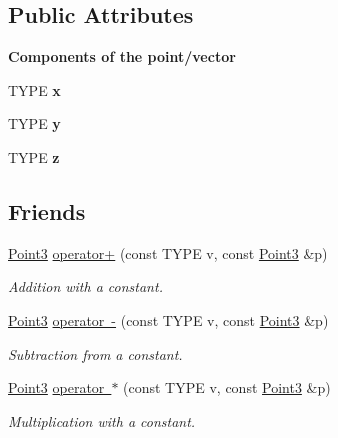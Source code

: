\subsection*{Public Attributes}
\begin{Indent}\textbf{ Components of the point/vector}\par
\begin{DoxyCompactItemize}
\item 
\mbox{\label{classcy_1_1_point3_a7dca00168c1355681da23267091b14a5}} 
T\+Y\+PE {\bfseries x}
\item 
\mbox{\label{classcy_1_1_point3_a93d893a1fa7e380e501eafb9c1cc613a}} 
T\+Y\+PE {\bfseries y}
\item 
\mbox{\label{classcy_1_1_point3_ac1192d48d48b7abe7eb1ad3e051918d9}} 
T\+Y\+PE {\bfseries z}
\end{DoxyCompactItemize}
\end{Indent}
\subsection*{Friends}
\begin{DoxyCompactItemize}
\item 
\mbox{\label{classcy_1_1_point3_a8bf2527b0b94700afd9a15438254ccc2}} 
\mbox{\hyperlink{classcy_1_1_point3}{Point3}} \mbox{\hyperlink{classcy_1_1_point3_a8bf2527b0b94700afd9a15438254ccc2}{operator+}} (const T\+Y\+PE v, const \mbox{\hyperlink{classcy_1_1_point3}{Point3}} \&p)
\begin{DoxyCompactList}\small\item\em Addition with a constant. \end{DoxyCompactList}\item 
\mbox{\label{classcy_1_1_point3_a027a6932bedc65e173256e4f11b4c9af}} 
\mbox{\hyperlink{classcy_1_1_point3}{Point3}} \mbox{\hyperlink{classcy_1_1_point3_a027a6932bedc65e173256e4f11b4c9af}{operator -\/}} (const T\+Y\+PE v, const \mbox{\hyperlink{classcy_1_1_point3}{Point3}} \&p)
\begin{DoxyCompactList}\small\item\em Subtraction from a constant. \end{DoxyCompactList}\item 
\mbox{\label{classcy_1_1_point3_ac31c142bf4ebbede031e6fb580a46c35}} 
\mbox{\hyperlink{classcy_1_1_point3}{Point3}} \mbox{\hyperlink{classcy_1_1_point3_ac31c142bf4ebbede031e6fb580a46c35}{operator $\ast$}} (const T\+Y\+PE v, const \mbox{\hyperlink{classcy_1_1_point3}{Point3}} \&p)
\begin{DoxyCompactList}\small\item\em Multiplication with a constant. \end{DoxyCompactList}\end{DoxyCompactItemize}


